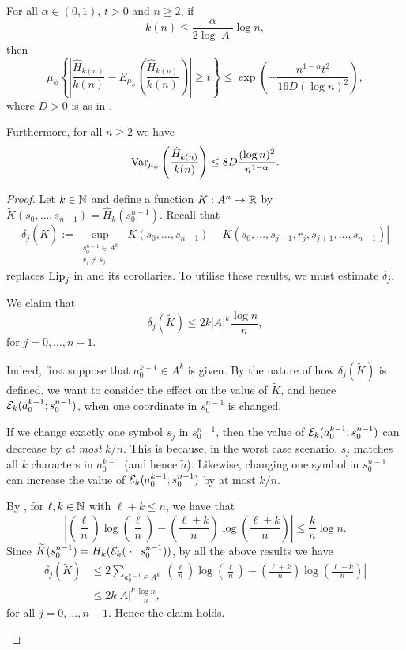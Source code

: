 \begin{theorem}\label{thm:cm-4-1}
	For all $\alpha \in (0, 1)$, $t > 0$ and $n \geq 2$, if
	\[
		k(n) \leq \frac{\alpha}{2 \log{|A|}}\log{n},
	\]
	then
	\[
		\mu_\phi\left\{\left|\frac{\hat{H}_{k(n)}}{k(n)} - E_{\mu_\phi}\left(\frac{\hat{H}_{k(n)}}{k(n)}\right)\right| \geq t\right\} \leq \exp\left(-\frac{n^{1 - \alpha} t^2}{16D(\log{n})^2}\right),
	\]
	where $D > 0$ is as in .
	
	Furthermore, for all $n \geq 2$ we have
	\[
		\operatorname{Var}_{\mu_\phi}\left(\frac{\hat{H}_{k(n)}}{k(n)}\right) \leq 8D\frac{(\log{n})^2}{n^{1 - \alpha}}.
	\]
	\begin{proof}
		Let $k \in \mathbb{N}$ and define a function $\widetilde{K} : A^n \to \mathbb{R}$ by $\tilde{K}(s_0, \dots, s_{n - 1}) = \hat{H}_k(s_0^{n - 1})$. Recall that
		\[
			\delta_j(\tilde{K}) := \sup_{\substack{s_0^{n - 1} \in A^k \\ r_j \neq s_j}}{|\tilde{K}(s_0, \dots, s_{n - 1}) - \tilde{K}(s_0, \dots, s_{j - 1}, r_j, s_{j + 1}, \dots, s_{n - 1})|}
		\]
		replaces $\operatorname{Lip}_j$ in  and its corollaries. To utilise these results, we must estimate $\delta_j$.
		\begin{claim}
			We claim that
			\begin{equation}
				\delta_j(\tilde{K}) \leq 2k|A|^k\frac{\log{n}}{n}, \label{fml:oscil-est}
			\end{equation}
			for $j = 0, \dots, n - 1$.
			
			Indeed, first suppose that $a_0^{k - 1} \in A^k$ is given. By the nature of how $\delta_j(\tilde{K})$ is defined, we want to consider the effect on the value of $\tilde{K}$, and hence $\mathcal{E}_k(a_0^{k - 1};s_0^{n - 1})$, when one coordinate in $s_0^{n - 1}$ is changed.
			
			If we change exactly one symbol $s_j$ in $s_0^{n - 1}$, then the value of $\mathcal{E}_k(a_0^{k - 1}; s_0^{n - 1})$ can decrease by \emph{at most} $k / n$. This is because, in the worst case scenario, $s_j$ matches all $k$ characters in $a_0^{k - 1}$ (and hence $\tilde{a}$). Likewise, changing one symbol in $s_0^{n - 1}$ can increase the value of $\mathcal{E}_k(a_0^{k - 1}; s_0^{n - 1})$ by at most $k / n$.
			
			By , for $\ell, k \in \mathbb{N}$ with $\ell+ k \leq n$, we have that
			\[
				\left|\left(\frac{\ell}{n}\right)\log\left(\frac{\ell}{n}\right) - \left(\frac{\ell + k}{n}\right)\log\left(\frac{\ell + k}{n}\right)\right| \leq \frac{k}{n}\log{n}.
			\]
			Since $\widetilde{K}(s_0^{n - 1}) = H_k(\mathcal{E}_k(\mathrel{}\cdot\mathrel{}; s_0^{n - 1}))$, by all the above results we have
			\begin{align*}
				\delta_j(\tilde{K}) &\leq 2\sum_{a_0^{k - 1} \in A^k}{\left|\left(\frac{\ell}{n}\right)\log\left(\frac{\ell}{n}\right) - \left(\frac{\ell + k}{n}\right)\log\left(\frac{\ell + k}{n}\right)\right|} \\
				 &\leq 2k|A|^k \frac{\log{n}}{n},
			\end{align*}
			for all $j = 0, \dots, n - 1$. Hence the claim holds.
		\end{claim}
		

\end{proof}
\end{theorem}
